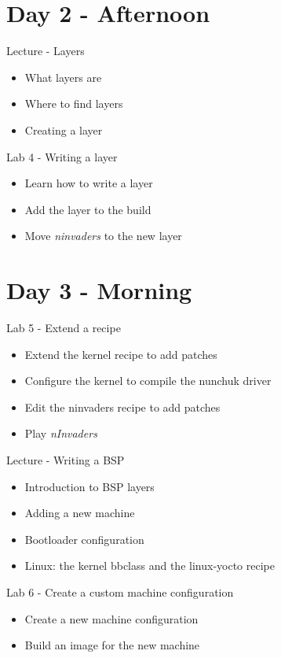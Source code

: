 \documentclass[a4paper,12pt,obeyspaces,spaces,hyphens]{article}
\begin{document}
\section{Day 2 - Afternoon}

\feagendatwocolumn
{Lecture - Layers}
{
  \begin{itemize}
  \item What layers are
  \item Where to find layers
  \item Creating a layer
  \end{itemize}
}
{Lab 4 - Writing a layer}
{
  \begin{itemize}
  \item Learn how to write a layer
  \item Add the layer to the build
  \item Move {\em ninvaders} to the new layer
  \end{itemize}
}

\section{Day 3 - Morning}

\feagendaonecolumn
{Lab 5 - Extend a recipe}
{
  \begin{itemize}
  \item Extend the kernel recipe to add patches
  \item Configure the kernel to compile the nunchuk driver
  \item Edit the ninvaders recipe to add patches
  \item Play {\em nInvaders}
  \end{itemize}
}

\feagendatwocolumn
{Lecture - Writing a BSP}
{
  \begin{itemize}
  \item Introduction to BSP layers
  \item Adding a new machine
  \item Bootloader configuration
  \item Linux: the kernel bbclass and the linux-yocto recipe
  \end{itemize}
}
{Lab 6 - Create a custom machine configuration}
{
  \begin{itemize}
  \item Create a new machine configuration
  \item Build an image for the new machine
  \end{itemize}
}
\end{document}
